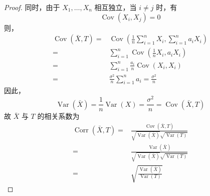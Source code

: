 \documentclass[normal,founder,mtpro2,cn]{elegantnote}
\begin{document}
\begin{enumerate}
\begin{proof}
            同时，由于 $X_{1},\ldots,X_{n}$ 相互独立，当 $i\neq j$ 时，有
            \begin{equation*}
                \operatorname{Cov}\left(X_{i},X_{j}\right)=0
            \end{equation*}
            则，
            \begin{equation*}
                \begin{aligned}
                    \operatorname{Cov}(\bar{X},T)= & \operatorname{Cov}\left(\frac{1}{n}\sum_{i=1}^{n}X_{i},\sum_{i=1}^{n}a_{i}X_{i}\right) \\
                    =                              & \sum_{i=1}^{n}\operatorname{Cov}\left(\frac{1}{n}X_{i},a_{i}X_{i}\right)               \\
                    =                              & \sum_{i=1}^{n}\frac{a_{i}}{n}\operatorname{Cov}\left(X_{i},X_{i}\right)                \\
                    =                              & \frac{\sigma^{2}}{n}\sum_{i=1}^{n}a_{i}=\frac{\sigma^{2}}{n}
                \end{aligned}
            \end{equation*}
            因此，
            \begin{equation*}
                \operatorname{Var}(\bar{X})=\frac{1}{n}\operatorname{Var}(X)=\frac{\sigma^{2}}{n}=\operatorname{Cov}(\bar{X},T)
            \end{equation*}
            故 $\bar{X}$ 与 $T$ 的相关系数为
            \begin{equation*}
                \begin{aligned}
                    \operatorname{Corr}(\bar{X},T)= & \frac{\operatorname{Cov}(\bar{X},T)}{\sqrt{\operatorname{Var}(\bar{X})}\sqrt{\operatorname{Var}(T)}} \\
                    =                               & \frac{\operatorname{Var}(\bar{X})}{\sqrt{\operatorname{Var}(\bar{X})}\sqrt{\operatorname{Var}(T)}}   \\
                    =                               & \sqrt{\frac{\operatorname{Var}(\bar{X})}{\operatorname{Var}(T)}}
                \end{aligned}
            \end{equation*}
        \end{proof}
\end{enumerate}
\end{document}

